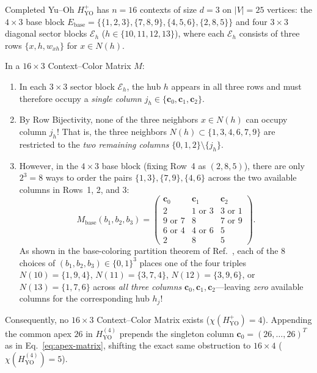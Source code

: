 \documentclass[aps,pra,reprint,superscriptaddress,longbibliography,nofootinbib,floatfix,10pt]{revtex4-2}
\theoremstyle{definition}\newtheorem{definition}[theorem]{Definition}
\theoremstyle{remark}\newtheorem{remark}[theorem]{Remark}
\newcommand{\YO}{\mathrm{YO}}\newcommand{\ip}[2]{\langle #1,#2\rangle}
\begin{document}
Completed Yu--Oh $H_{\YO}^+$ has $n=16$ contexts of size $d=3$ on $|V|=25$ vertices: the $4\times 3$ base block $E_{\mathrm{base}}=\{\{1,2,3\},\{7,8,9\},\{4,5,6\},\{2,8,5\}\}$ and four $3\times 3$ diagonal sector blocks $\mathcal{E}_{h}$ ($h\in\{10,11,12,13\}$), where each $\mathcal{E}_h$ consists of three rows $\{x,h,w_{xh}\}$ for $x\in N(h)$.

In a $16\times 3$ Context--Color Matrix $M$:
\begin{enumerate}
\item In each $3\times 3$ sector block $\mathcal{E}_h$, the hub $h$ appears in all three rows and must therefore occupy a \emph{single column} $j_h\in\{\mathbf{c}_0,\mathbf{c}_1,\mathbf{c}_2\}$.
\item By Row Bijectivity, none of the three neighbors $x\in N(h)$ can occupy column $j_h$! That is, the three neighbors $N(h)\subset\{1,3,4,6,7,9\}$ are restricted to the \emph{two remaining columns} $\{0,1,2\}\setminus\{j_h\}$.
\item However, in the $4\times 3$ base block (fixing Row~4 as $(2,8,5)$), there are only $2^3=8$ ways to order the pairs $\{1,3\},\{7,9\},\{4,6\}$ across the two available columns in Rows~1, 2, and 3:
\begin{equation}\label{eq:YO-base-matrix}
M_{\mathrm{base}}(b_1,b_2,b_3)=\begin{pmatrix}
\mathbf{c}_0 & \mathbf{c}_1 & \mathbf{c}_2\\\hline
2 & 1\text{ or }3 & 3\text{ or }1\\
9\text{ or }7 & 8 & 7\text{ or }9\\
6\text{ or }4 & 4\text{ or }6 & 5\\
2 & 8 & 5
\end{pmatrix}.
\end{equation}
As shown in the base-coloring partition theorem of Ref.~\cite{svozil2026contexts}, each of the $8$ choices of $(b_1,b_2,b_3)\in\{0,1\}^3$ places one of the four triples $N(10)=\{1,9,4\}$, $N(11)=\{3,7,4\}$, $N(12)=\{3,9,6\}$, or $N(13)=\{1,7,6\}$ across \emph{all three columns} $\mathbf{c}_0,\mathbf{c}_1,\mathbf{c}_2$—leaving \emph{zero} available columns for the corresponding hub $h_j$!
\end{enumerate}
Consequently, no $16\times 3$ Context--Color Matrix exists ($\chi(H_{\YO}^+)=4$). Appending the common apex $26$ in $H_{\YO}^{(4)}$ prepends the singleton column $\mathbf{c}_0=(26,\ldots,26)^T$ as in Eq.~\eqref{eq:apex-matrix}, shifting the exact same obstruction to $16\times 4$ ($\chi(H_{\YO}^{(4)})=5$).
\end{document}
